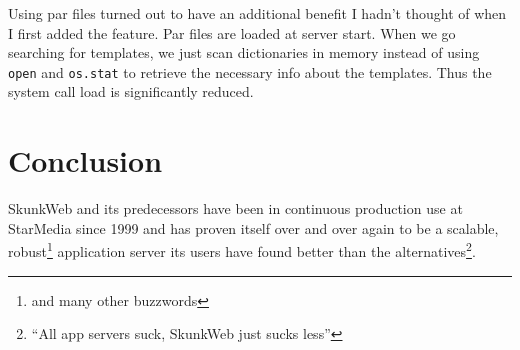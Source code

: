 \documentclass[twocolumn]{article}
\begin{document}
Using par files turned out to have an additional benefit I hadn't
thought of when I first added the feature.  Par files are loaded at
server start.  When we go searching for templates, we just scan
dictionaries in memory instead of using \texttt{open} and
\texttt{os.stat} to retrieve the necessary info about the templates.
Thus the system call load is significantly reduced.

\section{Conclusion}
SkunkWeb and its predecessors have been in continuous production use
at StarMedia since 1999 and has proven itself over and over again to
be a scalable, robust\footnote{and many other buzzwords} application
server its users have found better than the
alternatives\footnote{``All app servers suck, SkunkWeb just sucks
less''}.



\end{document}

